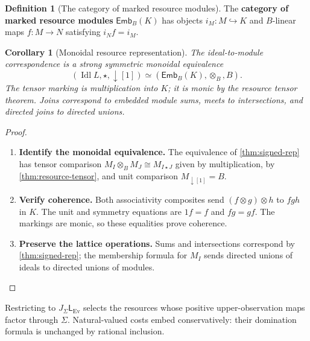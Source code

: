 \documentclass[11pt,a4paper]{article}
\numberwithin{algorithm}{section}
\numberwithin{equation}{section}
\newtheorem{corollary}[corollary]{Corollary}
\theoremstyle{definition}
\newtheorem{definition}[definition]{Definition}
\theoremstyle{remark}
\theoremstyle{plain}
\newcommand{\Idl}{\operatorname{Idl}}
\newcommand{\J}{J_{\Sigma}}
\newcommand{\incl}{\hookrightarrow}
\newcommand{\Emb}{\mathsf{Emb}}
\newcommand{\Ev}{{\operatorname{Ev}}}
\theoremstyle{definition}
\theoremstyle{plain}
\begin{document}
\begin{definition}[The category of marked resource modules]\label{def:marked-resource-category}
The \textbf{category of marked resource modules} $\Emb_B(K)$
has objects $i_M:M\incl K$ and $B$-linear maps $f:M\to N$
satisfying $i_Nf=i_M$.
\end{definition}

\begin{corollary}[Monoidal resource representation]
\label{cor:cat-monoidal-resources}
The ideal-to-module correspondence is a strong symmetric monoidal equivalence
\[
 (\Idl L,\star,\downarrow[1])
   \simeq(\Emb_B(K),\otimes_B,B).
\]
The tensor marking is multiplication into $K$; it is monic by the
resource tensor theorem.  Joins correspond to embedded module sums,
meets to intersections, and directed joins to directed unions.
\end{corollary}
\begin{proof}\leavevmode
\begin{enumerate}[leftmargin=*,align=left]
\item \textbf{Identify the monoidal equivalence.}
The equivalence of \cref{thm:signed-rep} has tensor comparison
$M_I\otimes_BM_J\cong M_{I\star J}$ given by multiplication,
by \cref{thm:resource-tensor}, and unit comparison
$M_{\downarrow[1]}=B$.

\item \textbf{Verify coherence.}
Both associativity composites send $(f\otimes g)\otimes h$ to
$fgh$ in $K$. The unit and symmetry equations are $1f=f$ and
$fg=gf$. The markings are monic, so these equalities prove coherence.

\item \textbf{Preserve the lattice operations.}
Sums and intersections correspond by \cref{thm:signed-rep};
the membership formula for $M_I$ sends directed unions of ideals
to directed unions of modules.
\end{enumerate}
\end{proof}


Restricting to $\J\mathsf L_\Ev$ selects the resources whose positive
upper-observation maps factor through $\Sigma$. Natural-valued costs embed conservatively:
their domination formula is unchanged by rational inclusion.
\end{document}
